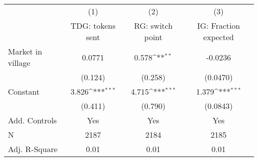 {
\def\sym#1{\ifmmode^{#1}\else\(^{#1}\)\fi}
\begin{tabular}{l*{3}{c}}
\hline\hline
                    &\multicolumn{1}{c}{(1)}&\multicolumn{1}{c}{(2)}&\multicolumn{1}{c}{(3)}\\
                    &\multicolumn{1}{c}{TDG: tokens sent}&\multicolumn{1}{c}{RG: switch point}&\multicolumn{1}{c}{IG: Fraction expected}\\
\hline
Market in village   &      0.0771         &       0.578\sym{**} &     -0.0236         \\
                    &     (0.124)         &     (0.258)         &    (0.0470)         \\
[1em]
Constant            &       3.826\sym{***}&       4.715\sym{***}&       1.379\sym{***}\\
                    &     (0.411)         &     (0.790)         &    (0.0843)         \\
[1em]
Add. Controls       &         Yes         &         Yes         &         Yes         \\
\hline
N                   &        2187         &        2184         &        2185         \\
Adj. R-Square       &        0.01         &        0.01         &        0.01         \\
\hline\hline
\end{tabular}
}
